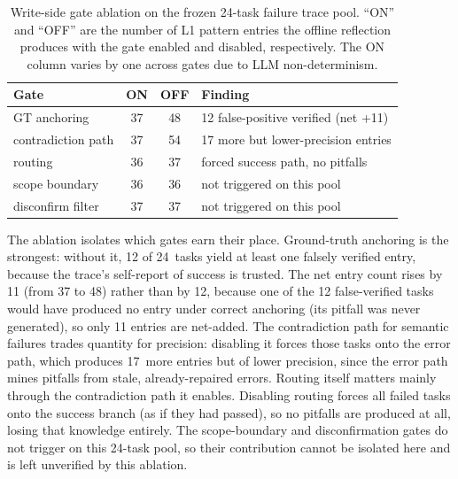 \documentclass[conference]{IEEEtran}
\begin{document}
\begin{table}[h]
\caption{Write-side gate ablation on the frozen 24-task failure trace pool. ``ON'' and ``OFF'' are the number of L1 pattern entries the offline reflection produces with the gate enabled and disabled, respectively. The ON column varies by one across gates due to LLM non-determinism.}
\label{tab:se_write_ablation}
\centering
\footnotesize
\begin{tabular}{lccl}
\toprule
Gate & ON & OFF & Finding \\
\midrule
GT anchoring       & 37 & 48 & 12 false-positive verified (net +11) \\
contradiction path & 37 & 54 & 17 more but lower-precision entries \\
routing            & 36 & 37 & forced success path, no pitfalls \\
scope boundary     & 36 & 36 & not triggered on this pool \\
disconfirm filter  & 37 & 37 & not triggered on this pool \\
\bottomrule
\end{tabular}
\end{table}

The ablation isolates which gates earn their place. Ground-truth anchoring is
the strongest: without it, 12 of 24~tasks yield at least one falsely verified
entry, because the trace's self-report of success is trusted. The net entry
count rises by 11 (from 37 to 48) rather than by 12, because one of the 12
false-verified tasks would have produced no entry under correct anchoring
(its pitfall was never generated), so only 11 entries are net-added. The contradiction path for semantic failures trades quantity for
precision: disabling it forces those tasks onto the error path, which produces
17~more entries but of lower precision, since the error path mines pitfalls
from stale, already-repaired errors. Routing itself matters mainly through the
contradiction path it enables. Disabling routing forces all failed tasks onto the
success branch (as if they had passed), so no pitfalls are produced at all,
losing that knowledge entirely. The scope-boundary and disconfirmation
gates do not trigger on this 24-task pool, so their contribution cannot be
isolated here and is left unverified by this ablation.
\end{document}
